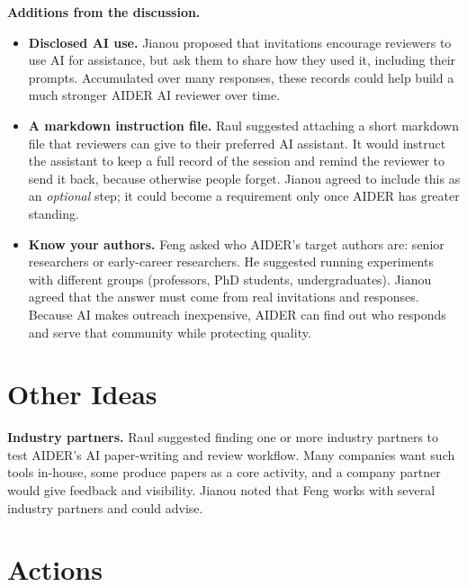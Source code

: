 \documentclass[11pt]{article}
\begin{document}
\textbf{Additions from the discussion.}
\begin{itemize}
  \item \textbf{Disclosed AI use.} Jianou proposed that invitations encourage reviewers to use AI for assistance, but ask them to share how they used it, including their prompts. Accumulated over many responses, these records could help build a much stronger AIDER AI reviewer over time.
  \item \textbf{A markdown instruction file.} Raul suggested attaching a short markdown file that reviewers can give to their preferred AI assistant. It would instruct the assistant to keep a full record of the session and remind the reviewer to send it back, because otherwise people forget. Jianou agreed to include this as an \emph{optional} step; it could become a requirement only once AIDER has greater standing.
  \item \textbf{Know your authors.} Feng asked who AIDER's target authors are: senior researchers or early-career researchers. He suggested running experiments with different groups (professors, PhD students, undergraduates). Jianou agreed that the answer must come from real invitations and responses. Because AI makes outreach inexpensive, AIDER can find out who responds and serve that community while protecting quality.
\end{itemize}

\section{Other Ideas}

\textbf{Industry partners.} Raul suggested finding one or more industry partners to test AIDER's AI paper-writing and review workflow. Many companies want such tools in-house, some produce papers as a core activity, and a company partner would give feedback and visibility. Jianou noted that Feng works with several industry partners and could advise.

\clearpage
\section{Actions}
\end{document}
